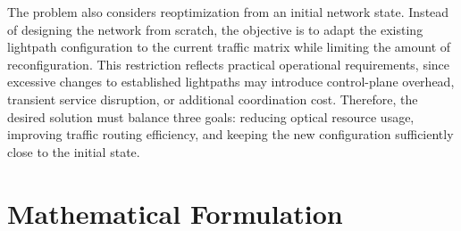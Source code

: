 \documentclass[conference]{IEEEtran}
\begin{document}
The problem also considers reoptimization from an initial network state. Instead of designing the network from scratch, the objective is to adapt the existing lightpath configuration to the current traffic matrix while limiting the amount of reconfiguration. This restriction reflects practical operational requirements, since excessive changes to established lightpaths may introduce control-plane overhead, transient service disruption, or additional coordination cost. Therefore, the desired solution must balance three goals: reducing optical resource usage, improving traffic routing efficiency, and keeping the new configuration sufficiently close to the initial state.

\section{Mathematical Formulation}
\label{sec:formulation}






\end{document}
